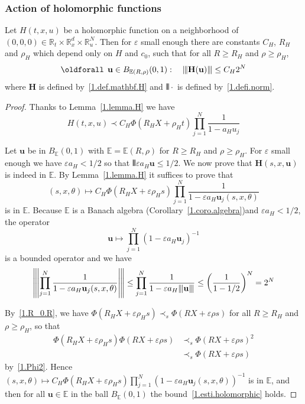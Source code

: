 \documentclass[AHL,Unicode,longabstracts,published]{cedram}
\theoremstyle{plain}
\newcommand*\e{\varepsilon}
\newcommand*\R{{\mathbb R}}
\newcommand*\EE{{\mathbb E}}
\newcommand{\ubf}{{\mathbf u}}
\newcommand{\Hbf}{{\mathbf H}}
\newcommand*\dsp{\displaystyle}
\DeclarePairedDelimiter{\VERT}{|\mkern -1.6mu|\mkern -1.6mu|}{|\mkern -1.6mu|\mkern -1.6mu|}
\renewcommand*{\forall}{\mathrel{\oldforall}}
\begin{document}
\subsubsection{Action of holomorphic functions}


\begin{lemm}\label{1.lemma.holomorphic}
Let $H(t,x,u)$ be a holomorphic function on a neighborhood of $(0,0,0)\in\R_{t}\times\R_{x}^{d}\times\R_{u}^{N}$. Then for $\e$ small enough there are constants $C_H$, $R_H$ and $\rho_H$ which depend only on $H$ and $c_0$, such that for all $R\geq R_H$ and $\rho\geq\rho_H$,
\begin{equation}\label{1.esti.holomorphic}
\forall \,\ubf\in B_{\EE(R,\rho)}(0,1): \quad \VERT{\Hbf(\ubf)}\leq C_{H}2^{N}
\end{equation}
where $\Hbf$ is defined by~\eqref{1.def.mathbf.H} and $\VERT{\cdot}$ is defined by~\eqref{1.defi.norm}.
\end{lemm}

\begin{proof}
Thanks to Lemma~\ref{1.lemma.H} we have
\[
H(t,x,u) \prec C_H \Phi(R_H X + \rho_H t) \prod_{j=1}^{N}\frac{\dsp 1}{1 - a_H u_j}
\]


Let $\ubf$ be in $ B_{\EE}(0,1)$ with $\EE=\EE(R,\rho)$ for $R \geq R_H$ and $\rho \geq \rho_H$. For $\e$ small enough we have $ \e a_{H} < 1/2 $ so that $ \VERT {\e a_H \ubf} \leq 1/2 $. We now prove that $\Hbf(s,x,\ubf)$ is indeed in $\EE$. By Lemma~\ref{1.lemma.H} it suffices to prove that
\[
(s,x,\theta) \mapsto C_H \Phi(R_H X + \e\rho_H s) \prod_{j=1}^{N}\frac{\dsp 1}{1 - \e a_H \ubf_j(s,x,\theta)}
\]
is in $\EE$. Because $\EE$ is a Banach algebra (Corollary~\ref{1.coro.algebra})and $\e a_{H} < 1/2$, the operator
\[
\ubf \mapsto \prod_{j=1}^{N}\left(1 - \e a_H \ubf_j\right)^{-1}
\]
is a bounded operator and we have
\[
\left|\mkern -1.6mu\left|\mkern -1.6mu\left|\prod_{j=1}^{N}\frac{\dsp 1}{1 - \e a_H \ubf_j(s,x,\theta)}\right|\mkern -1.6mu\right|\mkern -1.6mu\right|
\leq
\prod_{j=1}^{N}\frac{\dsp 1}{1 - \e a_H \VERT{\ubf}} \leq \left(\frac{\dsp 1}{1 - 1/2}\right)^{N} = 2^{N}
\]


By~\eqref{1.R_0.R}, we have $\Phi(R_H X + \e\rho_H s) \prec_{s} \Phi(R X+\e\rho s)$ for all $R\geq R_H$ and $\rho\geq\rho_H$, so that
\begin{align*}
\Phi(R_H X + \e\rho_H s) \Phi(R X+\e\rho s) & \prec_{s} \Phi(R X+\e\rho s)^2 \\
& \prec_{s} \Phi(R X+\e\rho s)
\end{align*}
by~\eqref{1.Phi2}. Hence $(s,x,\theta) \mapsto C_H \Phi(R_H X + \e\rho_H s) \prod_{j=1}^{N}(1 - \e a_H \ubf_j(s,x,\theta))^{-1}$ is in $\EE$, and then for all $\ubf\in\EE$ in the ball $B_{\EE}(0,1)$ the bound~\eqref{1.esti.holomorphic} holds.
\end{proof}
\end{document}
